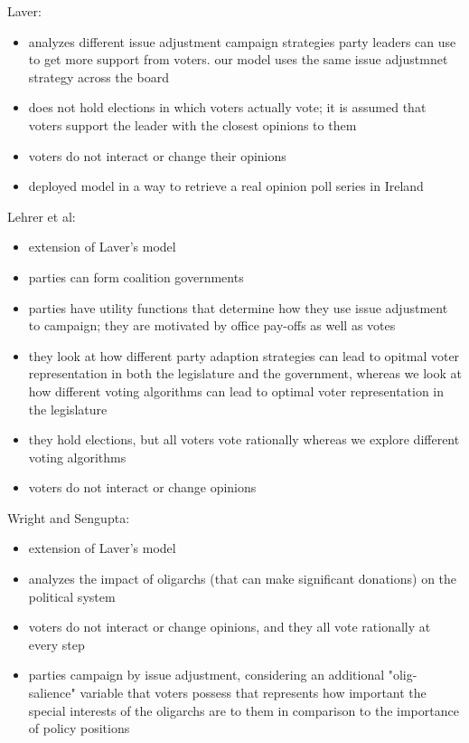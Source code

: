 Laver:
\begin{itemize}
\item analyzes different issue adjustment campaign strategies party leaders can use to get more support from voters. our model uses the same issue adjustmnet strategy across the board
\item does not hold elections in which voters actually vote; it is assumed that voters support the leader with the closest opinions to them
\item voters do not interact or change their opinions
\item deployed model in a way to retrieve a real opinion poll series in Ireland
\end{itemize}
Lehrer et al:
\begin{itemize}
\item extension of Laver's model
\item  parties can form coalition governments
\item  parties have utility functions that determine how they use issue adjustment to campaign; they are motivated by office pay-offs as well as votes
\item they look at how different party adaption strategies can lead to opitmal voter representation in both the legislature and the government, whereas we look at how different voting algorithms can lead to optimal voter representation in the legislature
\item they hold elections, but all voters vote rationally whereas we explore different voting algorithms
\item voters do not interact or change opinions
\end{itemize}
Wright and Sengupta:
\begin{itemize}
\item extension of Laver's model
\item analyzes the impact of oligarchs (that can make significant donations) on the political system
\item voters do not interact or change opinions, and they all vote rationally at every step
\item parties campaign by issue adjustment, considering an additional "olig-salience" variable that voters possess that represents how important the special interests of the oligarchs are to them in comparison to the importance of policy positions
\end{itemize}
